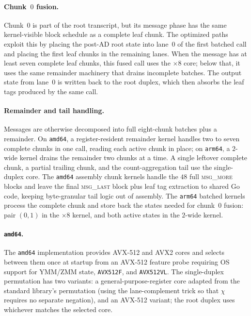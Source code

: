 \paragraph{Chunk~$0$ fusion.}
Chunk~$0$ is part of the root transcript, but its message phase has the
same kernel-visible block schedule as a complete leaf chunk. The optimized
paths exploit this by placing the post-AD root state into lane~$0$ of the
first batched call and placing the first leaf chunks in the remaining lanes.
When the message has at least seven complete leaf chunks, this fused call
uses the $\times 8$ core; below that, it uses the same remainder machinery
that drains incomplete batches. The output state from lane~$0$ is written
back to the root duplex, which then absorbs the leaf tags produced by the
same call.

\paragraph{Remainder and tail handling.}
Messages are otherwise decomposed into full eight-chunk batches plus a
remainder. On \texttt{amd64}, a register-resident remainder kernel handles
two to seven complete chunks in one call, reading each active chunk in
place; on \texttt{arm64}, a $2$-wide kernel drains the remainder two chunks
at a time. A single leftover complete chunk, a partial trailing chunk, and
the count-aggregation tail use the single-duplex core. The \texttt{amd64}
assembly chunk kernels handle the $48$ full \textsc{msg\_more} blocks and
leave the final \textsc{msg\_last} block plus leaf tag extraction to shared
Go code, keeping byte-granular tail logic out of assembly. The
\texttt{arm64} batched kernels process the complete chunk and store back the
states needed for chunk~$0$ fusion: pair $(0,1)$ in the $\times 8$ kernel,
and both active states in the $2$-wide kernel.

\paragraph{\texttt{amd64}.}
The \texttt{amd64} implementation provides AVX-512 and AVX2 cores and selects
between them once at startup from an AVX-512 feature probe requiring OS support
for YMM/ZMM state, \texttt{AVX512F}, and \texttt{AVX512VL}. The single-duplex
permutation has two variants: a general-purpose-register core adapted from the
standard library's \Keccak{} permutation (using the lane-complement trick so
that $\chi$ requires no separate negation), and an AVX-512 variant; the root
duplex uses whichever matches the selected core.

